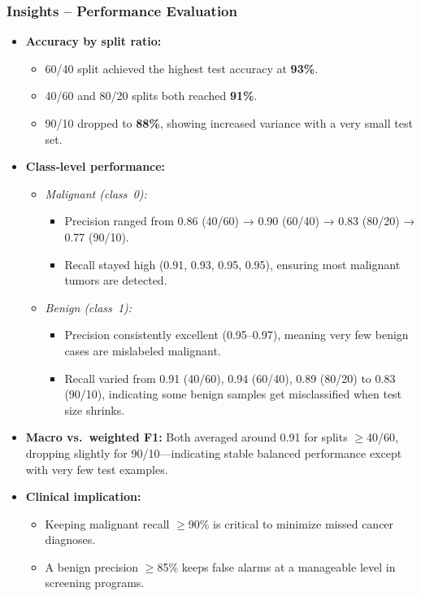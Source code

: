 \subsubsection*{Insights – Performance Evaluation}
\begin{itemize}
	\item \textbf{Accuracy by split ratio:}
	      \begin{itemize}
		      \item 60/40 split achieved the highest test accuracy at \textbf{93\%}.
		      \item 40/60 and 80/20 splits both reached \textbf{91\%}.
		      \item 90/10 dropped to \textbf{88\%}, showing increased variance with a very small test set.
	      \end{itemize}
	\item \textbf{Class‑level performance:}
	      \begin{itemize}
		      \item \emph{Malignant (class 0):}
		            \begin{itemize}
			            \item Precision ranged from 0.86 (40/60) → 0.90 (60/40) → 0.83 (80/20) → 0.77 (90/10).
			            \item Recall stayed high (0.91, 0.93, 0.95, 0.95), ensuring most malignant tumors are detected.
		            \end{itemize}
		      \item \emph{Benign (class 1):}
		            \begin{itemize}
			            \item Precision consistently excellent (0.95–0.97), meaning very few benign cases are mislabeled malignant.
			            \item Recall varied from 0.91 (40/60), 0.94 (60/40), 0.89 (80/20) to 0.83 (90/10), indicating some benign samples get misclassified when test size shrinks.
		            \end{itemize}
	      \end{itemize}
	\item \textbf{Macro vs.\ weighted F1:} Both averaged around 0.91 for splits \(\geq\)40/60, dropping slightly for 90/10—indicating stable balanced performance except with very few test examples.
	\item \textbf{Clinical implication:}
	      \begin{itemize}
		      \item Keeping malignant recall \(\geq\)90\% is critical to minimize missed cancer diagnoses.
		      \item A benign precision \(\geq\)85\% keeps false alarms at a manageable level in screening programs.
	      \end{itemize}
\end{itemize}

